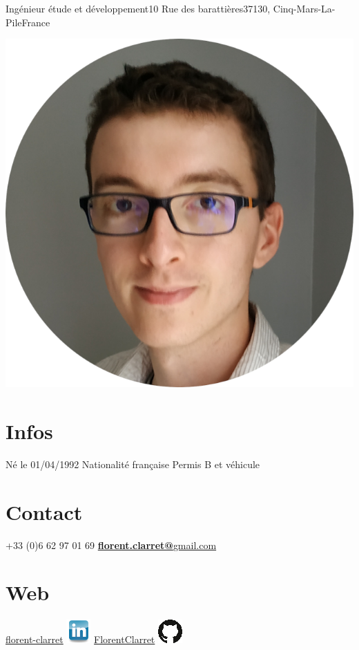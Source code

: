 \documentclass[]{friggeri-cv}
\begin{document}
 {Ingénieur étude et développement}{10 Rue des barattières}{37130, Cinq-Mars-La-Pile}{France}
      


\begin{aside}
  \includegraphics[scale=0.2]{img/photo.png}
\section{Infos}
    Né le 01/04/1992
    Nationalité française
    Permis B et véhicule
    ~
  \section{Contact}
   +33 (0)6 62 97 01 69
    \href{mailto:florent.clarret@gmail.com}{\textbf{florent.clarret@}gmail.com}
    ~
  \section{Web}
	    \href{https://www.linkedin.com/in/florent-clarret/}{florent-clarret} \includegraphics{img/linkedin.png} 
	    \href{https://github.com/FlorentClarret}{FlorentClarret} \includegraphics{img/github.png} 
    ~

\end{aside}
\end{document}
